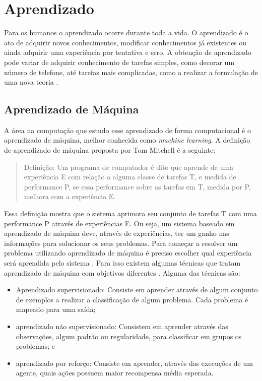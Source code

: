 \chapter{\label{chap:aprendizado}Aprendizado}
 
Para os humanos o aprendizado ocorre durante toda a vida. 
O aprendizado é o ato de adquirir novos conhecimentos, modificar conhecimentos já existentes ou ainda adquirir uma experiência por tentativa e erro. 
A obtenção de aprendizado pode variar de adquirir conhecimento de tarefas simples, como decorar um número de telefone, até tarefas mais complicadas, como a realizar a formulação de uma nova teoria \cite{intelligence2003modern}. 

\section{Aprendizado de Máquina} 

A área na computação que estudo esse aprendizado de forma computacional é o aprendizado de máquina, melhor conhecida como \textit{machine learning}. 
A definição de aprendizado de máquina proposta por Tom Mitchell \cite{Mitchell1997ML} é a seguinte:

\begin{quote}
	Definição: Um programa de computador é dito que aprende de uma experiência E com relação a alguma classe de tarefas T, e medida de performance P, se essa performance sobre as tarefas em T, medida por P, melhora com a experiência E.
\end{quote}

Essa definição mostra que o sistema aprimora seu conjunto de tarefas T com uma performance P através de experiências E. 
Ou seja, um sistema baseado em aprendizado de máquina deve, através de experiências, ter um ganho nas informações para solucionar os seus problemas. 
Para começar a resolver um problema utilizando aprendizado de máquina é preciso escolher qual experiência será aprendida pelo sistema \cite{Mitchell1997ML}. 
Para isso existem algumas técnicas que tratam aprendizado de máquina com objetivos diferentes \cite{intelligence2003modern}. 
Alguma das técnicas são: 
\begin{itemize}
	\item Aprendizado supervisionado: Consiste em aprender através de algum conjunto de exemplos a realizar a classificação de algum problema. Cada problema é mapeado para uma saída;  
	\item aprendizado não supervisionado: Consistem em aprender através das observações, algum padrão ou regularidade, para classificar em grupos os problemas; e 
	\item aprendizado por reforço: Consiste em aprender, através das execuções de um agente, quais ações possuem maior recompensa média esperada.
\end{itemize}

